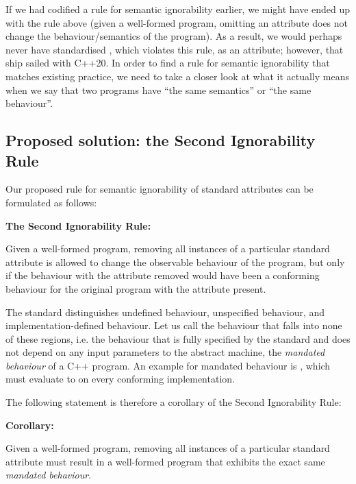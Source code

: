 If we had codified a rule for semantic ignorability earlier, we might have ended up with the rule above (given a well-formed program, omitting an attribute does not change the behaviour/semantics of the program). As a result, we would perhaps never have standardised \mbox{}, which violates this rule, as an attribute; however, that ship sailed with C++20.
In order to find a rule for semantic ignorability that matches existing practice, we need to take a closer look at what it actually means when we say that two programs have ``the same semantics'' or ``the same behaviour''.

\subsection{Proposed solution: the Second Ignorability Rule}
\label{subsec:proposal_semantic}

Our proposed rule for semantic ignorability of standard attributes can be formulated as follows:

\begin{adjustwidth}{0.5cm}{0.5cm}
\textbf{The Second Ignorability Rule:}

Given a well-formed program, removing all instances of a particular standard attribute is allowed to change the observable behaviour of the program, but only if the behaviour with the attribute removed would have been a conforming behaviour for the original program with the attribute present.
\end{adjustwidth}

The standard distinguishes undefined behaviour, unspecified behaviour, and implementation-defined behaviour. Let us call the behaviour that falls into none of these regions, i.e. the behaviour that is fully specified by the standard and does not depend on any input parameters to the abstract machine, the \emph{mandated behaviour} of a C++ program. An example for mandated behaviour is , which must evaluate to  on every conforming implementation.

The following statement is therefore a corollary of the Second Ignorability Rule:

\begin{adjustwidth}{0.5cm}{0.5cm}
\textbf{Corollary:}

Given a well-formed program, removing all instances of a particular standard attribute must result in a well-formed program that exhibits the exact same \emph{mandated behaviour}. 
\end{adjustwidth}

